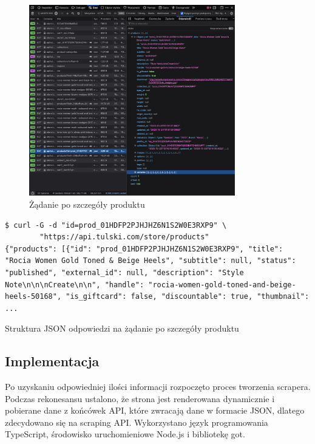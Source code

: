 \begin{figure}[H]
    \centering
    \includegraphics[width=0.8\textwidth]{img/store-get-product-details}
    \caption{Żądanie po szczegóły produktu}
    \label{fig:store-get-product-details}
\end{figure}
\begin{listing}[H]
    \begin{verbatim}
$ curl -G -d "id=prod_01HDFP2PJHJHZ6N1S2W0E3RXP9" \
        "https://api.tulski.com/store/products"
{"products": [{"id": "prod_01HDFP2PJHJHZ6N1S2W0E3RXP9", "title": "Rocia Women Gold Toned & Beige Heels", "subtitle": null, "status": "published", "external_id": null, "description": "Style Note\n\n\nCreate\n\n", "handle": "rocia-women-gold-toned-and-beige-heels-50168", "is_giftcard": false, "discountable": true, "thumbnail": ...
    \end{verbatim}
    \caption{Struktura JSON odpowiedzi na żądanie po szczegóły produktu}
    \label{lst:store-get-product-details-request}
\end{listing}

\subsection{Implementacja}\label{subsec:scraper-implementation}

Po uzyskaniu odpowiedniej ilości informacji rozpoczęto proces tworzenia scrapera.
Podczas rekonesansu ustalono, że strona jest renderowana dynamicznie i pobierane dane z końcówek API, które zwracają dane w formacie JSON, dlatego zdecydowano się na scraping API\@.
Wykorzystano język programowania TypeScript, środowisko uruchomieniowe Node.js i bibliotekę got.

